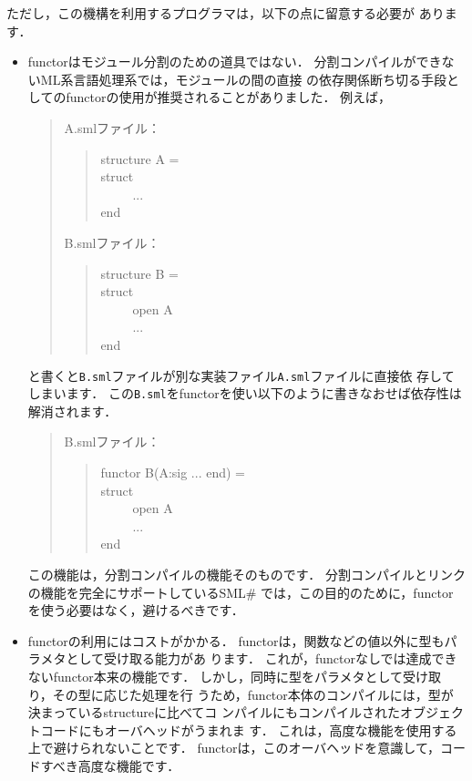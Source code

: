 \documentclass{jbook}
\newcommand{\smlsharp}{SML\#}
\newenvironment{program}{\begin{tt}\begin{quote}}{\end{quote}\end{tt}}
\newcommand{\myem}{\ \ \ \ \  }
\begin{document}
	ただし，この機構を利用するプログラマは，以下の点に留意する必要が
あります．
\begin{itemize}
\item functorはモジュール分割のための道具ではない．
	分割コンパイルができないML系言語処理系では，モジュールの間の直接
の依存関係断ち切る手段としてのfunctorの使用が推奨されることがありました．
	例えば，
\begin{quote}
\begin{minipage}{0.9\textwidth}
A.smlファイル：
\begin{program}
structure A =\\
struct\\
\myem   ...\\
end
\end{program}
B.smlファイル：
\begin{program}
structure B = \\
struct\\
\myem  open A\\
\myem  ...\\
end
\end{program}
\end{minipage}
\end{quote}
と書くと{\tt B.sml}ファイルが別な実装ファイル{\tt A.sml}ファイルに直接依
存してしまいます．
	この{\tt B.sml}をfunctorを使い以下のように書きなおせば依存性は解消されます．
\begin{quote}
\begin{minipage}{0.9\textwidth}
B.smlファイル：
\begin{program}
functor B(A:sig ... end) = \\
struct\\
\myem  open A\\
\myem  ...\\
end
\end{program}
\end{minipage}
\end{quote}	
	この機能は，分割コンパイルの機能そのものです．
	分割コンパイルとリンクの機能を完全にサポートしている\smlsharp{}
では，この目的のために，functorを使う必要はなく，避けるべきです．

\item functorの利用にはコストがかかる．
	functorは，関数などの値以外に型もパラメタとして受け取る能力があ
ります．
	これが，functorなしでは達成できないfunctor本来の機能です．
	しかし，同時に型をパラメタとして受け取り，その型に応じた処理を行
うため，functor本体のコンパイルには，型が決まっているstructureに比べてコ
ンパイルにもコンパイルされたオブジェクトコードにもオーバヘッドがうまれま
す．
	これは，高度な機能を使用する上で避けられないことです．
	functorは，このオーバヘッドを意識して，コードすべき高度な機能です．
\end{itemize}
\end{document}
